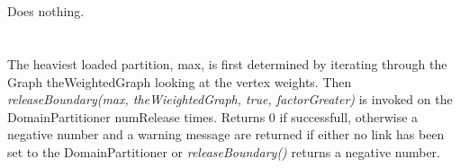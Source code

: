  \\
  \\ 
Does nothing. \\

 \\
 \\ 
The heaviest loaded partition, \p max, is first determined by
iterating through the Graph \p theWeightedGraph looking at the
vertex weights. Then {\em releaseBoundary(max, theWieightedGraph,
true, factorGreater)} is invoked on the
DomainPartitioner \p numRelease times. Returns $0$ if successfull,
otherwise a negative number and a warning message are returned if
either no link has been set to the DomainPartitioner or {\em
releaseBoundary()} returns a negative number. \\



